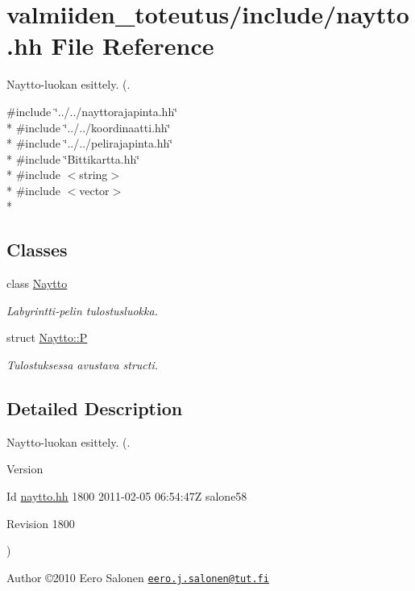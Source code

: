 \hypertarget{naytto_8hh}{}\section{valmiiden\+\_\+toteutus/include/naytto.hh File Reference}
\label{naytto_8hh}


Naytto-\/luokan esittely. (.  


{\ttfamily \#include \char`\"{}../../nayttorajapinta.\+hh\char`\"{}}\\*
{\ttfamily \#include \char`\"{}../../koordinaatti.\+hh\char`\"{}}\\*
{\ttfamily \#include \char`\"{}../../pelirajapinta.\+hh\char`\"{}}\\*
{\ttfamily \#include \char`\"{}Bittikartta.\+hh\char`\"{}}\\*
{\ttfamily \#include $<$string$>$}\\*
{\ttfamily \#include $<$vector$>$}\\*
\subsection*{Classes}
\begin{DoxyCompactItemize}
\item 
class \hyperlink{class_naytto}{Naytto}
\begin{DoxyCompactList}\small\item\em Labyrintti-\/pelin tulostusluokka. \end{DoxyCompactList}\item 
struct \hyperlink{struct_naytto_1_1_p}{Naytto\+::\+P}
\begin{DoxyCompactList}\small\item\em Tulostuksessa avustava structi. \end{DoxyCompactList}\end{DoxyCompactItemize}


\subsection{Detailed Description}
Naytto-\/luokan esittely. (. 

\begin{DoxyVersion}{Version}

\end{DoxyVersion}
\begin{DoxyParagraph}{Id}
\hyperlink{naytto_8hh}{naytto.\+hh} 1800 2011-\/02-\/05 06\+:54\+:47\+Z salone58 
\end{DoxyParagraph}


\begin{DoxyParagraph}{Revision}
1800 
\end{DoxyParagraph}
) \begin{DoxyAuthor}{Author}
©2010 Eero Salonen \href{mailto:eero.j.salonen@tut.fi}{\tt eero.\+j.\+salonen@tut.\+fi} 
\end{DoxyAuthor}
